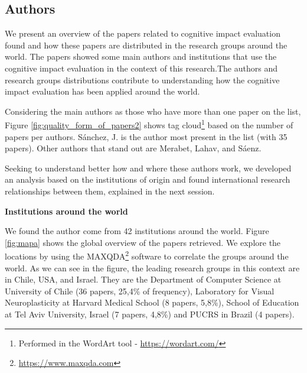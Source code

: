 \subsection{Authors}
\label{subsec:results-slr-authors}

We present an overview of the papers related to cognitive impact evaluation found and how these papers are distributed in the research groups around the world. The papers showed some main authors and institutions that use the cognitive impact evaluation in the context of this research.The authors and research groups distributions contribute to understanding how the cognitive impact evaluation has been applied around the world.

Considering the main authors as those who have more than one paper on the list, Figure \ref{fig:quality_form_of_papers2} shows tag cloud\footnote{Performed in the WordArt tool - \url{https://wordart.com/}} based on the number of papers per authors. Sánchez, J. is the author most present in the list (with 35 papers). Other authors that stand out are Merabet, Lahav, and Sáenz.

 	\begin{figure}[h] 
   	    \captionsetup{width=12cm}%
	\end{figure}

Seeking to understand better how and where these authors work, we developed an analysis based on the institutions of origin and found international research relationships between them, explained in the next session.

\textbf{Institutions around the world}

We found the author come from 42 institutions around the world. Figure \ref{fig:mapa} shows the global overview of the papers retrieved. We explore the locations by using the MAXQDA\footnote{\url{https://www.maxqda.com}} software to correlate the groups around the world. As we can see in the figure, the leading research groups in this context are in Chile, USA, and Israel. They are the Department of Computer Science at University of Chile (36 papers, 25,4\% of frequency), Laboratory for Visual Neuroplasticity at Harvard Medical School (8 papers, 5,8\%), School of Education at Tel Aviv University, Israel (7 papers, 4,8\%) and PUCRS in Brazil (4 papers).

